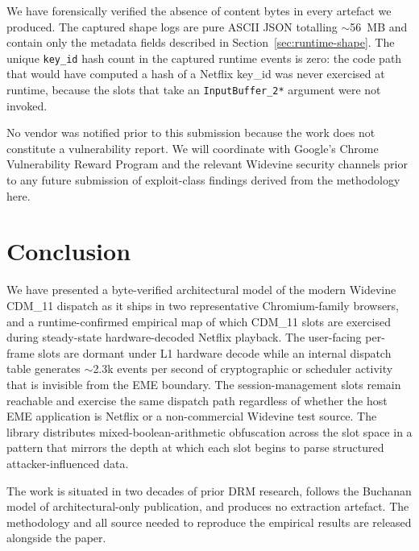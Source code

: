 \documentclass[11pt,letterpaper]{article}
\let\oldsection\section
\renewcommand{\section}{\clearpage\oldsection}
\begin{document}
We have forensically verified the absence of content bytes in every
artefact we produced. The captured shape logs are pure ASCII JSON
totalling $\sim$56~MB and contain only the metadata fields described
in Section~\ref{sec:runtime-shape}. The unique \texttt{key\_id}
hash count in the captured runtime events is zero: the code path
that would have computed a hash of a Netflix key\_id was never
exercised at runtime, because the slots that take an
\texttt{InputBuffer\_2*} argument were not invoked.

No vendor was notified prior to this submission because the work
does not constitute a vulnerability report. We will coordinate with
Google's Chrome Vulnerability Reward Program and the relevant
Widevine security channels prior to any future submission of
exploit-class findings derived from the methodology here.

\section{Conclusion}
\label{sec:conclusion}

We have presented a byte-verified architectural model of the modern
Widevine CDM\_11 dispatch as it ships in two representative
Chromium-family browsers, and a runtime-confirmed empirical map of
which CDM\_11 slots are exercised during steady-state
hardware-decoded Netflix playback. The user-facing per-frame slots
are dormant under L1 hardware decode while an internal dispatch
table generates $\sim$2.3k events per second of cryptographic or
scheduler activity that is invisible from the EME boundary. The
session-management slots remain reachable and exercise the same
dispatch path regardless of whether the host EME application is
Netflix or a non-commercial Widevine test source. The library
distributes mixed-boolean-arithmetic obfuscation across the slot
space in a pattern that mirrors the depth at which each slot
begins to parse structured attacker-influenced data.

The work is situated in two decades of prior DRM research, follows
the Buchanan model of architectural-only publication, and produces
no extraction artefact. The methodology and all source needed to
reproduce the empirical results are released alongside the paper.
\end{document}
